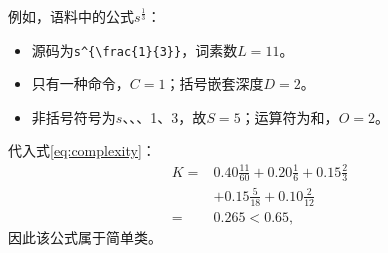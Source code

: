 例如，语料中的公式$s^{\frac{1}{3}}$：
\begin{itemize}
\item 源码为\texttt{s\textasciicircum{}\{\textbackslash{}frac\{1\}\{3\}\}}，词素数$L=11$。
\item 只有\code{\frac}一种命令，$C=1$；括号嵌套深度$D=2$。
\item 非括号符号为$s$、\code{^}、\code{\frac}、1、3，故$S=5$；运算符为\code{^}和\code{\frac}，$O=2$。
\end{itemize}
代入式\eqref{eq:complexity}：
\[
\begin{aligned}
K={}&0.40\frac{11}{60}+0.20\frac{1}{6}+0.15\frac{2}{3}\\
&+0.15\frac{5}{18}+0.10\frac{2}{12}\\
={}&0.265<0.65,
\end{aligned}
\]
因此该公式属于简单类。
